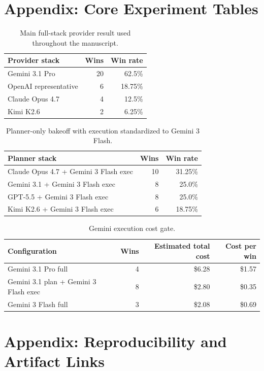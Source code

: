 \documentclass[11pt]{article}
\begin{document}
\section{Appendix: Core Experiment Tables}

\begin{table}[H]
\centering
\caption{Main full-stack provider result used throughout the manuscript.}
\begin{tabular}{lrr}
\toprule
Provider stack & Wins & Win rate \\
\midrule
Gemini 3.1 Pro & 20 & 62.5\% \\
OpenAI representative & 6 & 18.75\% \\
Claude Opus 4.7 & 4 & 12.5\% \\
Kimi K2.6 & 2 & 6.25\% \\
\bottomrule
\end{tabular}
\end{table}

\begin{table}[H]
\centering
\caption{Planner-only bakeoff with execution standardized to Gemini 3 Flash.}
\begin{tabular}{lrr}
\toprule
Planner stack & Wins & Win rate \\
\midrule
Claude Opus 4.7 + Gemini 3 Flash exec & 10 & 31.25\% \\
Gemini 3.1 + Gemini 3 Flash exec & 8 & 25.0\% \\
GPT-5.5 + Gemini 3 Flash exec & 8 & 25.0\% \\
Kimi K2.6 + Gemini 3 Flash exec & 6 & 18.75\% \\
\bottomrule
\end{tabular}
\end{table}

\begin{table}[H]
\centering
\caption{Gemini execution cost gate.}
\begin{tabular}{lrrr}
\toprule
Configuration & Wins & Estimated total cost & Cost per win \\
\midrule
Gemini 3.1 Pro full & 4 & \$6.28 & \$1.57 \\
Gemini 3.1 plan + Gemini 3 Flash exec & 8 & \$2.80 & \$0.35 \\
Gemini 3 Flash full & 3 & \$2.08 & \$0.69 \\
\bottomrule
\end{tabular}
\end{table}

\section{Appendix: Reproducibility and Artifact Links}
\end{document}

